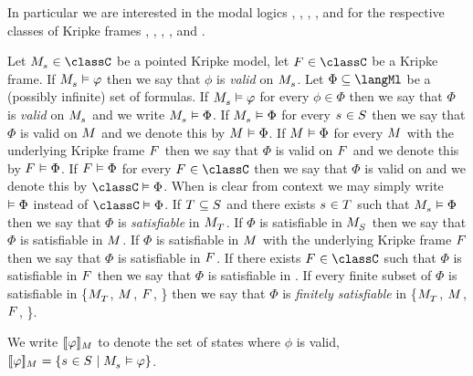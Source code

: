 In particular we are interested in the modal logics \logicK{}, \logicKF{}, \logicKFF{}, \logicKD{}, \logicSF{} and \logicS{} for the respective classes of Kripke frames \classK{}, \classKF{}, \classKFF{}, \classKD{}, \classSF{} and \classS{}.

Let $\kPModel{\kStateS} \in \classC$ be a pointed Kripke model,
let $\kFrame \in \classC$ be a Kripke frame.
If $\kPModel{\kStateS} \entails \phi$ then we say that $\phi$ is {\em valid} on $\kPModel{\kStateS}$.
Let $\Phi \subseteq \langMl$ be a (possibly infinite) set of formulas.
If $\kPModel{\kStateS} \entails \phi$ for every $\phi \in \Phi$ then we say that $\Phi$ is {\em valid} on $\kPModel{\kStateS}$ and we write $\kPModel{\kStateS} \entails \Phi$.
If $\kPModel{\kStateS} \entails \Phi$ for every $\kStateS \in \kStates$ then we say that $\Phi$ is valid on $\kModel$ and we denote this by $\kModel \entails \Phi$.
If $\kModel \entails \Phi$ for every $\kModel$ with the underlying Kripke frame $\kFrame$ then we say that $\Phi$ is valid on $\kFrame$ and we denote this by $\kFrame \entails \Phi$.
If $\kFrame \entails \Phi$ for every $\kFrame \in \classC$ then we say that $\Phi$ is valid on \classC{} and we denote this by $\classC \entails \Phi$.
When \classC{} is clear from context we may simply write $\vDash \Phi$ instead of $\classC \entails \Phi$.
If $\kStatesT \subseteq \kStates$ and there exists $\kStateS \in \kStatesT$ such that $\kPModel{\kStateS} \entails \Phi$ then we say that $\Phi$ is {\em satisfiable} in $\kPModel{\kStatesT}$.
If $\Phi$ is satisfiable in $\kPModel{\kStates}$ then we say that $\Phi$ is satisfiable in $\kModel$.
If $\Phi$ is satisfiable in $\kModel$ with the underlying Kripke frame $\kFrame$ then we say that $\Phi$ is satisfiable in $\kFrame$.
If there exists $\kFrame \in \classC$ such that $\Phi$ is satisfiable in $\kFrame$ then we say that $\Phi$ is satisfiable in \classC{}.
If every finite subset of $\Phi$ is satisfiable in \{$\kPModel{\kStatesT}$, $\kModel$, $\kFrame$, \classC{}\} then we say that $\Phi$ is {\em finitely satisfiable} in \{$\kPModel{\kStatesT}$, $\kModel$, $\kFrame$, \classC{}\}.

We write $\interpretation[\kModel]{\phi}$ to denote the set of states where $\phi$ is valid, $\interpretation[\kModel]{\phi} = \{\kStateS \in \kStates \mid \kPModel{\kStateS} \entails \phi\}$.

